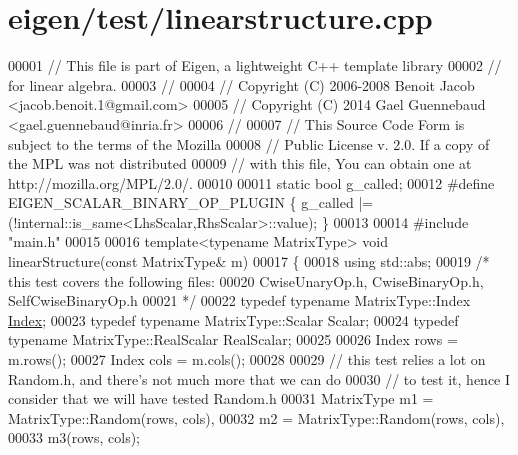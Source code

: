 \hypertarget{eigen_2test_2linearstructure_8cpp_source}{}\section{eigen/test/linearstructure.cpp}
\label{eigen_2test_2linearstructure_8cpp_source}

\begin{DoxyCode}
00001 \textcolor{comment}{// This file is part of Eigen, a lightweight C++ template library}
00002 \textcolor{comment}{// for linear algebra.}
00003 \textcolor{comment}{//}
00004 \textcolor{comment}{// Copyright (C) 2006-2008 Benoit Jacob <jacob.benoit.1@gmail.com>}
00005 \textcolor{comment}{// Copyright (C) 2014 Gael Guennebaud <gael.guennebaud@inria.fr>}
00006 \textcolor{comment}{//}
00007 \textcolor{comment}{// This Source Code Form is subject to the terms of the Mozilla}
00008 \textcolor{comment}{// Public License v. 2.0. If a copy of the MPL was not distributed}
00009 \textcolor{comment}{// with this file, You can obtain one at http://mozilla.org/MPL/2.0/.}
00010 
00011 \textcolor{keyword}{static} \textcolor{keywordtype}{bool} g\_called;
00012 \textcolor{preprocessor}{#define EIGEN\_SCALAR\_BINARY\_OP\_PLUGIN \{ g\_called |= (!internal::is\_same<LhsScalar,RhsScalar>::value); \}}
00013 
00014 \textcolor{preprocessor}{#include "main.h"}
00015 
00016 \textcolor{keyword}{template}<\textcolor{keyword}{typename} MatrixType> \textcolor{keywordtype}{void} linearStructure(\textcolor{keyword}{const} MatrixType& m)
00017 \{
00018   \textcolor{keyword}{using} std::abs;
00019   \textcolor{comment}{/* this test covers the following files:}
00020 \textcolor{comment}{     CwiseUnaryOp.h, CwiseBinaryOp.h, SelfCwiseBinaryOp.h }
00021 \textcolor{comment}{  */}
00022   \textcolor{keyword}{typedef} \textcolor{keyword}{typename} MatrixType::Index \hyperlink{namespace_eigen_a62e77e0933482dafde8fe197d9a2cfde}{Index};
00023   \textcolor{keyword}{typedef} \textcolor{keyword}{typename} MatrixType::Scalar Scalar;
00024   \textcolor{keyword}{typedef} \textcolor{keyword}{typename} MatrixType::RealScalar RealScalar;
00025 
00026   Index rows = m.rows();
00027   Index cols = m.cols();
00028 
00029   \textcolor{comment}{// this test relies a lot on Random.h, and there's not much more that we can do}
00030   \textcolor{comment}{// to test it, hence I consider that we will have tested Random.h}
00031   MatrixType m1 = MatrixType::Random(rows, cols),
00032              m2 = MatrixType::Random(rows, cols),
00033              m3(rows, cols);

\end{DoxyCode}
